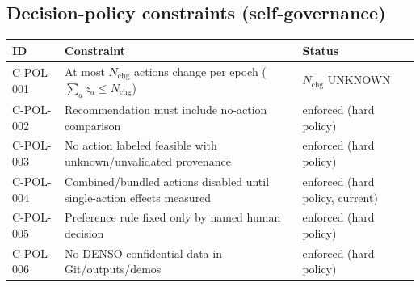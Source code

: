 \documentclass[11pt,a4paper]{article}
\begin{document}
\subsection*{Decision-policy constraints (self-governance)}

\begin{center}
\small
\begin{tabular}{@{}lp{9.0cm}p{3.0cm}@{}}
\toprule
ID & Constraint & Status \\
\midrule
C-POL-001 & At most $N_{\mathrm{chg}}$ actions change per epoch
($\sum_a z_a \le N_{\mathrm{chg}}$) & $N_{\mathrm{chg}}$ UNKNOWN \\
C-POL-002 & Recommendation must include no-action comparison & enforced
(hard policy) \\
C-POL-003 & No action labeled feasible with unknown/unvalidated provenance &
enforced (hard policy) \\
C-POL-004 & Combined/bundled actions disabled until single-action effects
measured & enforced (hard policy, current) \\
C-POL-005 & Preference rule fixed only by named human decision & enforced
(hard policy) \\
C-POL-006 & No DENSO-confidential data in Git/outputs/demos & enforced (hard
policy) \\
\bottomrule
\end{tabular}
\end{center}



\end{document}
